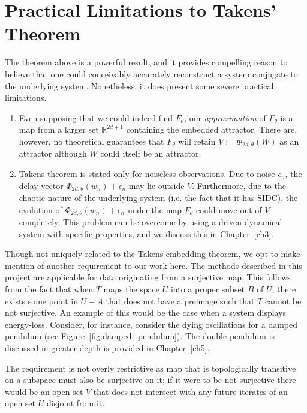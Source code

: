 \section{Practical Limitations to Takens' Theorem}\label{sect_takenslimits}
The theorem above is a powerful result, and it provides compelling reason to believe that one could conceivably accurately reconstruct a system conjugate to the underlying system. 
Nonetheless, it does present some severe practical limitations.
\vspace{-5mm}
\begin{enumerate}
\item Even supposing that we could indeed find $F_\theta$, our \emph{approximation} of  $F_\theta$ is a map from a larger set $\mathbb{R}^{2d+1}$ containing the embedded attractor. There are, however, no theoretical guarantees that $F_\theta$ will retain  $V:=\Phi_{2d,\theta}(W)$  as an attractor although $W$ could itself be an attractor.
\item Takens theorem is stated only for noiseless observations. Due to noise $\epsilon_n$, the delay vector $\Phi_{2d,\theta}(w_n) + \epsilon_n$  may lie outside $V$. Furthermore, due to the chaotic nature of the underlying system (i.e. the fact that it has SIDC), the evolution of $\Phi_{2d,\theta}(w_n) + \epsilon_n$ under the map $F_\theta$ could move out of $V$ completely. This problem can be overcome  by using a driven dynamical system with specific properties, and we discuss this in Chapter~\ref{ch3}. 
\end{enumerate}



Though not uniquely related to the Takens embedding theorem, we opt to make mention of another requirement to our work here. 
The methods described in this project are applicable for data originating from a surjective map. 
This follows from the fact that when $T$ maps the space $U$ into a proper subset $B$ of $U$, there exists some point in $U - A$ that does not have a preimage such that $T$ cannot be not surjective. 
An example of this would be the case when a system displays energy-loss. 
Consider, for instance, consider the dying oscillations for a damped pendulum (see Figure~\ref{fig:damped_pendulum}). The double pendulum is discussed in greater depth  is provided in Chapter~\ref{ch5}.

The requirement is not overly restrictive as map that is topologically transitive on a subspace must also be surjective on it; if it were to be not surjective there would be an open set $V$ that does not intersect with any future iterates of an open set  $U$ disjoint from it.